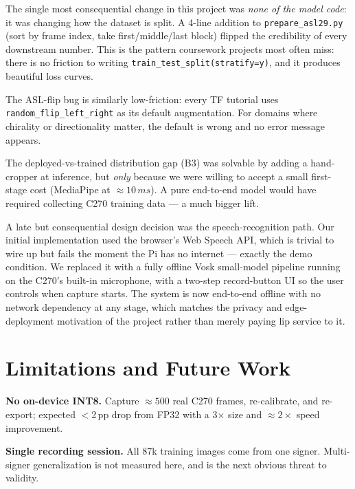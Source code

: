 \documentclass[sigconf,nonacm]{acmart}
\begin{document}
The single most consequential change in this project was \emph{none of
the model code}: it was changing how the dataset is split.  A 4-line
addition to \texttt{prepare\_asl29.py} (sort by frame index, take
first/middle/last block) flipped the credibility of every downstream
number.  This is the pattern coursework projects most often miss: there
is no friction to writing \texttt{train\_test\_split(stratify=y)}, and it
produces beautiful loss curves.

The ASL-flip bug is similarly low-friction: every TF tutorial uses
\texttt{random\_flip\_left\_right} as its default augmentation.  For
domains where chirality or directionality matter, the default is wrong
and no error message appears.

The deployed-vs-trained distribution gap (B3) was solvable by adding a
hand-cropper at inference, but \emph{only} because we were willing to
accept a small first-stage cost (MediaPipe at ${\approx}10\,ms$).  A
pure end-to-end model would have required collecting C270 training data ---
a much bigger lift.

A late but consequential design decision was the speech-recognition path.
Our initial implementation used the browser's Web Speech API, which is
trivial to wire up but fails the moment the Pi has no internet ---
exactly the demo condition.  We replaced it with a fully offline Vosk
small-model pipeline running on the C270's built-in microphone, with a
two-step record-button UI so the user controls when capture starts.
The system is now end-to-end offline with no network dependency at any
stage, which matches the privacy and edge-deployment motivation of the
project rather than merely paying lip service to it.

\section{Limitations and Future Work}

\textbf{No on-device INT8.}  Capture ${\approx}500$ real C270 frames,
re-calibrate, and re-export; expected $<$2\,pp drop from FP32 with
a 3$\times$ size and ${\approx}2\times$ speed improvement.

\textbf{Single recording session.}  All 87k training images come from
one signer.  Multi-signer generalization is not measured here, and is
the next obvious threat to validity.
\end{document}

